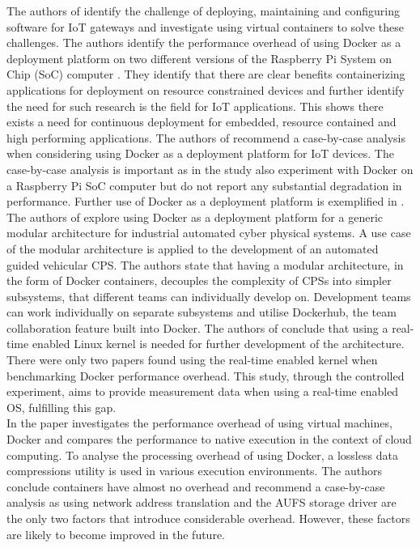 The authors of \cite{2iot} identify the challenge of deploying, maintaining and configuring software for IoT gateways and investigate using virtual containers to solve these challenges. The authors identify the performance overhead of using Docker as a deployment platform on two different versions of the Raspberry Pi System on Chip (SoC) computer \cite{raspberry}. They identify that there are clear benefits containerizing applications for deployment on resource constrained devices and further identify the need for such research is the field for IoT applications. This shows there exists a need for continuous deployment for embedded, resource contained and high performing applications. The authors of \cite{2iot} recommend a case-by-case analysis when considering using Docker as a deployment platform for IoT devices. The case-by-case analysis is important as in \cite{gonz} the study also experiment with Docker on a Raspberry Pi SoC computer but do not report any substantial degradation in performance. Further use of Docker as a deployment platform is exemplified in \cite{gonz}. The authors of \cite{gonz} explore using Docker as a deployment platform for a generic modular architecture for industrial automated cyber physical systems. A use case of the modular architecture is applied to the development of an automated guided vehicular CPS. The authors state that having a modular architecture, in the form of Docker containers, decouples the complexity of CPSs into simpler subsystems, that different teams can individually develop on. Development teams can work individually on separate subsystems and utilise Dockerhub, the team collaboration feature built into Docker. The authors of \cite{gonz} conclude that using a real-time enabled Linux kernel is needed for further development of the architecture. There were only two papers found using the real-time enabled kernel when benchmarking Docker performance overhead. This study, through the controlled experiment, aims to provide measurement data when using a real-time enabled OS, fulfilling this gap. \\

In \cite{p6} the paper investigates the performance overhead of using virtual machines, Docker and compares the performance to native execution in the context of cloud computing. To analyse the processing overhead of using Docker, a lossless data compressions utility is used in various execution environments. The authors conclude containers have almost no overhead and recommend a case-by-case analysis as using network address translation and the AUFS storage driver are the only two factors that introduce considerable overhead. However, these factors are likely to become improved in the future. \\

